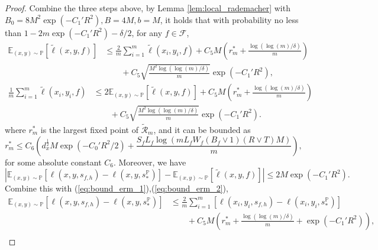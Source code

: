 \documentclass{article}
\numberwithin{equation}{section}
\def\eqref#1{equation~\ref{#1}}
\newcommand{\E}{\mathbb{E}}
\theoremstyle{definition}
\renewcommand{\P}{\mathbb{P}}
\renewcommand{\eqref}[1]{(\ref{#1})}
\begin{document}
\begin{proof}
    Combine the three steps above, by Lemma \ref{lem:local_rademacher} with $B_0=8M^2\exp(-C_1'R^2),B=4M,b=M$, it holds that with probability no less than $1-2m\exp(-C_1'R^2)-\delta/2$, for any $f\in\mathcal{F}$,
    \begin{equation}\label{eq:bound_erm_1}
        \begin{aligned}
            \E_{(x,y)\sim\P} [\widetilde{\ell}(x,y,f)]
            &\leq \frac{2}{m}\sum_{i=1}^m \widetilde{\ell}(x_i,y_i,f) + C_5M\left(r_m^*+\frac{\log(\log(m)/\delta)}{m}\right) \\
            &\qquad + C_5\sqrt{\frac{M^2\log(\log(m)/\delta)}{m}}\exp(-C_1'R^2),
        \end{aligned}
    \end{equation}
    \begin{equation}\label{eq:bound_erm_2}
        \begin{aligned}
            \frac{1}{m}\sum_{i=1}^m \widetilde{\ell}(x_i,y_i,f)
            &\leq 2\E_{(x,y)\sim\P} [\widetilde{\ell}(x,y,f)] + C_5M\left(r_m^*+\frac{\log(\log(m)/\delta)}{m}\right) \\
            &\qquad + C_5\sqrt{\frac{M^2\log(\log(m)/\delta)}{m}}\exp(-C_1'R^2).
        \end{aligned}
    \end{equation}
    where $r_m^*$ is the largest fixed point of $\widetilde{\mathcal{R}}_m$, and it can be bounded as
    \begin{equation}
        r_m^*\leq C_6\left(d_x^{\frac{1}{2}}M\exp(-C_0'R^2/2)+\frac{S_fL_f\log\left(mL_fW_f(B_f\vee 1)(R\vee T)M\right)}{m}\right),
    \end{equation}
    for some absolute constant $C_6$.
    Moreover, we have
    \begin{equation}
        \left|\E_{(x,y)\sim\P}[\ell(x,y,s_{f,h})-\ell(x,y,s_*^\P)]
        - \E_{(x,y)\sim\P}[\widetilde{\ell}(x,y,f)]\right| \leq 2M\exp(-C_1'R^2).
    \end{equation}
    Combine this with \eqref{eq:bound_erm_1},\eqref{eq:bound_erm_2},
    \begin{equation}\label{eq:bound_erm_3}
        \begin{aligned}
            \E_{(x,y)\sim\P} [\ell(x,y,s_{f,h})-\ell(x,y,s_*^\P)]
            &\leq \frac{2}{m}\sum_{i=1}^m [\ell(x_i,y_i,s_{f,h})-\ell(x_i,y_i,s_*^\P)] \\
            &\qquad + C_5M\left(r_m^*+\frac{\log(\log(m)/\delta)}{m}+\exp(-C_1'R^2)\right), \\

\end{aligned}
\end{equation}
\end{proof}
\end{document}

